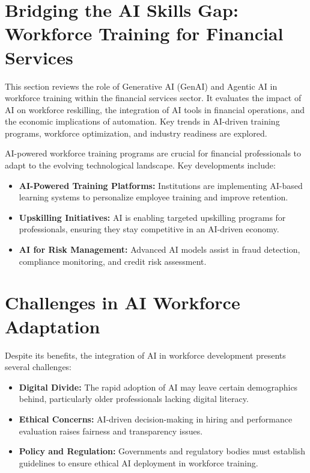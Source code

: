 \documentclass[a4paper,headinclude=on,footinclude=on,12pt,oneside]{scrbook}
\begin{document}
\section{Bridging the AI Skills Gap: Workforce Training for Financial Services}


This section reviews the role of Generative AI (GenAI) and Agentic AI in workforce training within the financial services sector. It evaluates the impact of AI on workforce reskilling, the integration of AI tools in financial operations, and the economic implications of automation. Key trends in AI-driven training programs, workforce optimization, and industry readiness are explored.






AI-powered workforce training programs are crucial for financial professionals to adapt to the evolving technological landscape. Key developments include:
\begin{itemize}
	\item \textbf{AI-Powered Training Platforms:} Institutions are implementing AI-based learning systems to personalize employee training and improve retention.
	\item \textbf{Upskilling Initiatives:} AI is enabling targeted upskilling programs for professionals, ensuring they stay competitive in an AI-driven economy.
	\item \textbf{AI for Risk Management:} Advanced AI models assist in fraud detection, compliance monitoring, and credit risk assessment.
\end{itemize}

\section{Challenges in AI Workforce Adaptation}

Despite its benefits, the integration of AI in workforce development presents several challenges:
\begin{itemize}
	\item \textbf{Digital Divide:} The rapid adoption of AI may leave certain demographics behind, particularly older professionals lacking digital literacy.
	\item \textbf{Ethical Concerns:} AI-driven decision-making in hiring and performance evaluation raises fairness and transparency issues.
	\item \textbf{Policy and Regulation:} Governments and regulatory bodies must establish guidelines to ensure ethical AI deployment in workforce training.
\end{itemize}
\end{document}
